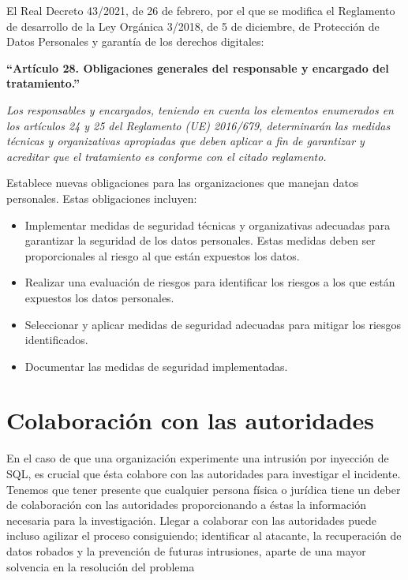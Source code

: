 \documentclass[11pt]{report}
\begin{document}
El Real Decreto 43/2021, de 26 de febrero, por el que se modifica el Reglamento de desarrollo de la Ley Orgánica 3/2018, de 5 de diciembre, de Protección
de Datos Personales y garantía de los derechos digitales:

\begin{center}
  \textbf{“Artículo 28. Obligaciones generales del responsable y encargado del tratamiento.”}
\end{center}
\emph{Los responsables y encargados, teniendo en cuenta los elementos enumerados en los artículos 24 y 25 del Reglamento (UE) 2016/679, determinarán las
medidas técnicas y organizativas apropiadas que deben aplicar a fin de garantizar y acreditar que el tratamiento es conforme con el citado reglamento.}

Establece nuevas obligaciones para las organizaciones que manejan datos personales. Estas obligaciones incluyen:
\begin{itemize}
  \item Implementar medidas de seguridad técnicas y organizativas adecuadas para garantizar la seguridad de los datos personales. Estas medidas deben
  ser proporcionales al riesgo al que están expuestos los datos.

  \item Realizar una evaluación de riesgos para identificar los riesgos a los que están expuestos los datos personales.
  
  \item Seleccionar y aplicar medidas de seguridad adecuadas para mitigar los riesgos identificados.
  
  \item Documentar las medidas de seguridad implementadas.
\end{itemize}

\section{Colaboración con las autoridades}
En el caso de que una organización experimente una intrusión por inyección de SQL, es crucial que ésta colabore con las autoridades para investigar el
incidente. Tenemos que tener presente que cualquier persona física o jurídica tiene un deber de colaboración con las autoridades proporcionando a éstas
la información necesaria para la investigación. Llegar a colaborar con las autoridades puede incluso agilizar el proceso consiguiendo; identificar al atacante,
la recuperación de datos robados y la prevención de futuras intrusiones, aparte de una mayor solvencia en la resolución del problema
\end{document}
